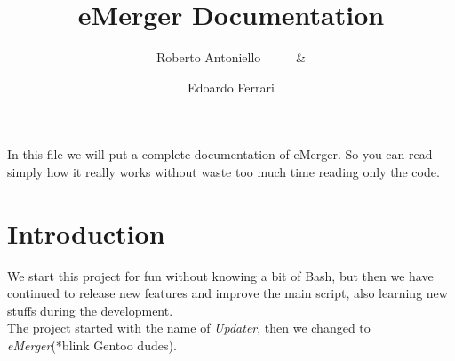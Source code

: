 \documentclass{article}
\author{
  Roberto Antoniello \ \ \ \ \ \&
  \and
  Edoardo Ferrari} %
\title{eMerger Documentation} %
\begin{document}
\maketitle %

\begin{center}In this file we will put a complete documentation of eMerger. So you can read simply how it really works without waste too much time reading only the code.
\end{center}

\section{Introduction}
We start this project for fun without knowing a bit of Bash, but then we have continued to release new features and improve the main script, also learning new stuffs during the development.\\
The project started with the name of \textit{Updater}, then we changed to \textit{eMerger}(*blink Gentoo dudes).
\end{document}
